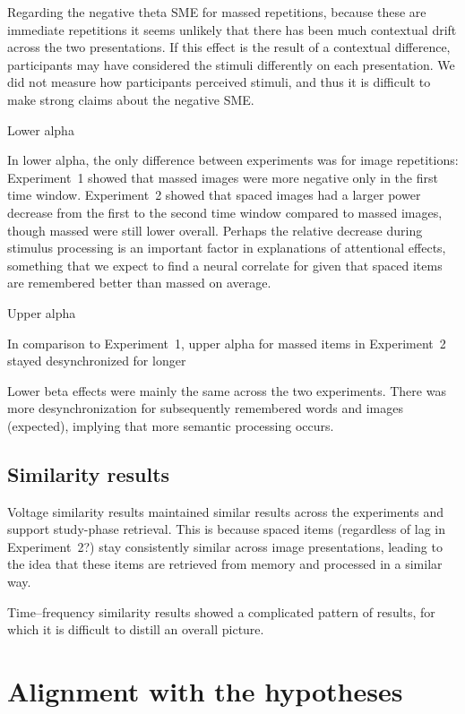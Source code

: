 Regarding the negative theta SME for massed repetitions, because these are immediate repetitions it seems unlikely that there has been much contextual drift across the two presentations.  If this effect is the result of a contextual difference, participants may have considered the stimuli differently on each presentation.  We did not measure how participants perceived stimuli, and thus it is difficult to make strong claims about the negative SME.


Lower alpha

In lower alpha, the only difference between experiments was for image repetitions: Experiment~1 showed that massed images were more negative only in the first time window.  Experiment~2 showed that spaced images had a larger power decrease from the first to the second time window compared to massed images, though massed were still lower overall.  Perhaps the relative decrease during stimulus processing is an important factor in explanations of attentional effects, something that we expect to find a neural correlate for given that spaced items are remembered better than massed on average.


Upper alpha

In comparison to Experiment~1, upper alpha for massed items in Experiment~2 stayed desynchronized for longer


Lower beta effects were mainly the same across the two experiments.  There was more desynchronization for subsequently remembered words and images (expected), implying that more semantic processing occurs.

\subsection{Similarity results}


Voltage similarity results maintained similar results across the experiments and support study-phase retrieval.  This is because spaced items (regardless of lag in Experiment~2?) stay consistently similar across image presentations, leading to the idea that these items are retrieved from memory and processed in a similar way.

Time--frequency similarity results showed a complicated pattern of results, for which it is difficult to distill an overall picture.

\section{Alignment with the hypotheses}

